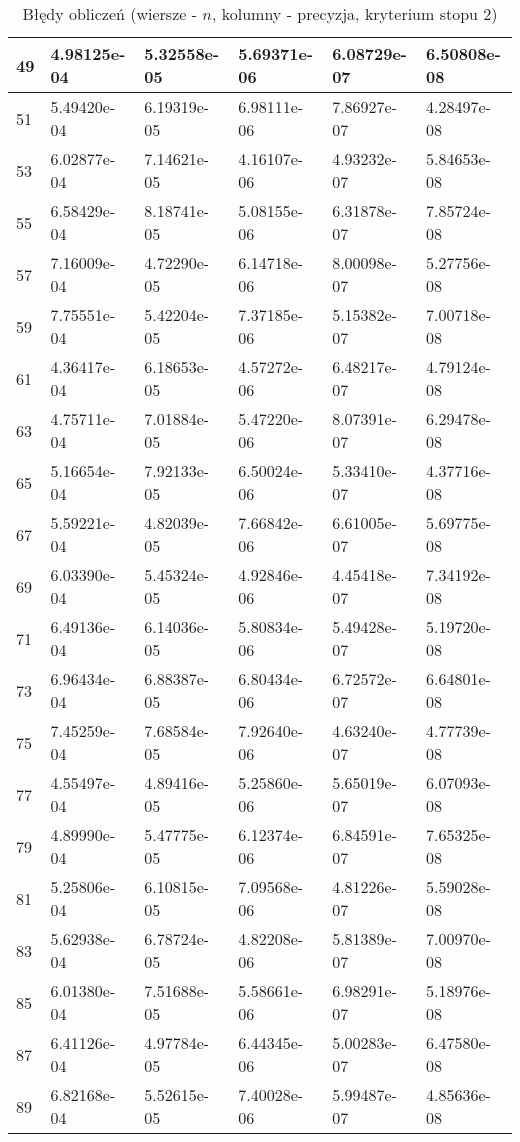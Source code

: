 \documentclass{article}
\begin{document}
\begin{table}[H]
\begin{tabular}{|l|l|l|l|l|l|}
49 & 4.98125e-04 & 5.32558e-05 & 5.69371e-06 & 6.08729e-07 & 6.50808e-08 \\ \hline
51 & 5.49420e-04 & 6.19319e-05 & 6.98111e-06 & 7.86927e-07 & 4.28497e-08 \\ \hline
53 & 6.02877e-04 & 7.14621e-05 & 4.16107e-06 & 4.93232e-07 & 5.84653e-08 \\ \hline
55 & 6.58429e-04 & 8.18741e-05 & 5.08155e-06 & 6.31878e-07 & 7.85724e-08 \\ \hline
57 & 7.16009e-04 & 4.72290e-05 & 6.14718e-06 & 8.00098e-07 & 5.27756e-08 \\ \hline
59 & 7.75551e-04 & 5.42204e-05 & 7.37185e-06 & 5.15382e-07 & 7.00718e-08 \\ \hline
61 & 4.36417e-04 & 6.18653e-05 & 4.57272e-06 & 6.48217e-07 & 4.79124e-08 \\ \hline
63 & 4.75711e-04 & 7.01884e-05 & 5.47220e-06 & 8.07391e-07 & 6.29478e-08 \\ \hline
65 & 5.16654e-04 & 7.92133e-05 & 6.50024e-06 & 5.33410e-07 & 4.37716e-08 \\ \hline
67 & 5.59221e-04 & 4.82039e-05 & 7.66842e-06 & 6.61005e-07 & 5.69775e-08 \\ \hline
69 & 6.03390e-04 & 5.45324e-05 & 4.92846e-06 & 4.45418e-07 & 7.34192e-08 \\ \hline
71 & 6.49136e-04 & 6.14036e-05 & 5.80834e-06 & 5.49428e-07 & 5.19720e-08 \\ \hline
73 & 6.96434e-04 & 6.88387e-05 & 6.80434e-06 & 6.72572e-07 & 6.64801e-08 \\ \hline
75 & 7.45259e-04 & 7.68584e-05 & 7.92640e-06 & 4.63240e-07 & 4.77739e-08 \\ \hline
77 & 4.55497e-04 & 4.89416e-05 & 5.25860e-06 & 5.65019e-07 & 6.07093e-08 \\ \hline
79 & 4.89990e-04 & 5.47775e-05 & 6.12374e-06 & 6.84591e-07 & 7.65325e-08 \\ \hline
81 & 5.25806e-04 & 6.10815e-05 & 7.09568e-06 & 4.81226e-07 & 5.59028e-08 \\ \hline
83 & 5.62938e-04 & 6.78724e-05 & 4.82208e-06 & 5.81389e-07 & 7.00970e-08 \\ \hline
85 & 6.01380e-04 & 7.51688e-05 & 5.58661e-06 & 6.98291e-07 & 5.18976e-08 \\ \hline
87 & 6.41126e-04 & 4.97784e-05 & 6.44345e-06 & 5.00283e-07 & 6.47580e-08 \\ \hline
89 & 6.82168e-04 & 5.52615e-05 & 7.40028e-06 & 5.99487e-07 & 4.85636e-08 \\ \hline
\end{tabular}
\caption{Błędy obliczeń (wiersze - $n$, kolumny - precyzja, kryterium stopu 2)}
\end{table}
\end{document}
